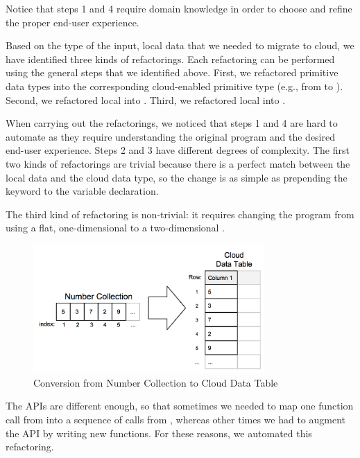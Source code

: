 \documentclass[preprint]{sigplanconf}
\begin{document}
Notice that steps 1 and 4 require domain knowledge in order to choose and refine the proper end-user experience.  
 
Based on the type of the input, local data that we needed to migrate to cloud, we have identified three kinds of refactorings. Each refactoring can be performed using the general steps that we identified above. First, we refactored primitive data 
types into the corresponding cloud-enabled primitive type (e.g., from  to ).
Second, we refactored local  into . Third, we refactored local 
into .

When carrying out the refactorings, we noticed that steps 1 and 4 are hard to automate as they require understanding the original program and the desired end-user experience. Steps 2 and 3 have different degrees of complexity. 
The first two kinds of refactorings  are trivial because there is a perfect match between the local data and the cloud data type, so the change is as simple as prepending the keyword  to the variable declaration. 

The third kind of refactoring is non-trivial: it requires changing the program from using a flat, one-dimensional  to a two-dimensional  .
\begin{figure}[htbp!]
\begin{center}
\includegraphics[width=250pt]{images/convertCollectionToTable}
\nocaptionrule
\caption{Conversion from Number Collection to Cloud Data Table}
\label{fig:ncToCDT}
\end{center}
\end{figure}
 The APIs are different enough, so that sometimes we needed to map one function call from  into a sequence of calls from , whereas other times we had to augment the API by writing new functions. 
For these reasons, we automated this refactoring. 
\end{document}
